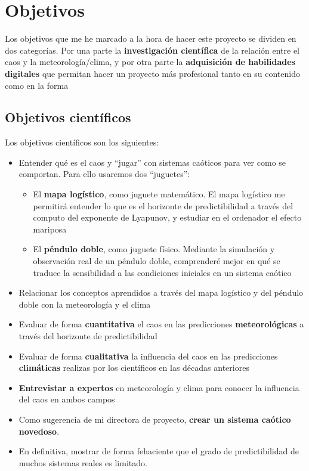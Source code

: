 \documentclass[
  10pt,
  a4paper,
  DIV=11,
  numbers=noendperiod,
  open=any]{scrreprt}
\providecommand{\tightlist}{%
  \setlength{\itemsep}{0pt}\setlength{\parskip}{0pt}}
\numberwithin{equation}{chapter}
\numberwithin{equation}{section}
\renewcommand{\[}{\begin{equation}}
\renewcommand{\]}{\end{equation}}
\begin{document}
\chapter{Objetivos}\label{objetivos}

Los objetivos que me he marcado a la hora de hacer este proyecto se
dividen en dos categorías. Por una parte la \textbf{investigación
científica} de la relación entre el caos y la meteorología/clima, y por
otra parte la \textbf{adquisición de habilidades digitales} que permitan
hacer un proyecto más profesional tanto en su contenido como en la forma

\section{Objetivos científicos}\label{objetivos-cientuxedficos}

Los objetivos científicos son los siguientes:

\begin{itemize}
\item
  Entender qué es el caos y ``jugar'' con sistemas caóticos para ver
  como se comportan. Para ello usaremos dos ``juguetes'':

  \begin{itemize}
  \tightlist
  \item
    El \textbf{mapa logístico}, como juguete matemático. El mapa
    logístico me permitirá entender lo que es el horizonte de
    predictibilidad a través del computo del exponente de Lyapunov, y
    estudiar en el ordenador el efecto mariposa
  \item
    El \textbf{péndulo doble}, como juguete físico. Mediante la
    simulación y observación real de un péndulo doble, comprenderé mejor
    en qué se traduce la sensibilidad a las condiciones iniciales en un
    sistema caótico
  \end{itemize}
\item
  Relacionar los conceptos aprendidos a través del mapa logístico y del
  péndulo doble con la meteorología y el clima
\item
  Evaluar de forma \textbf{cuantitativa} el caos en las predicciones
  \textbf{meteorológicas} a través del horizonte de predictibilidad
\item
  Evaluar de forma \textbf{cualitativa} la influencia del caos en las
  predicciones \textbf{climáticas} realizas por los científicos en las
  décadas anteriores
\item
  \textbf{Entrevistar a expertos} en meteorología y clima para conocer
  la influencia del caos en ambos campos
\item
  Como sugerencia de mi directora de proyecto, \textbf{crear un sistema
  caótico novedoso}.
\item
  En definitiva, mostrar de forma fehaciente que el grado de predictibilidad de muchos sistemas reales es limitado.
\end{itemize}
\end{document}
